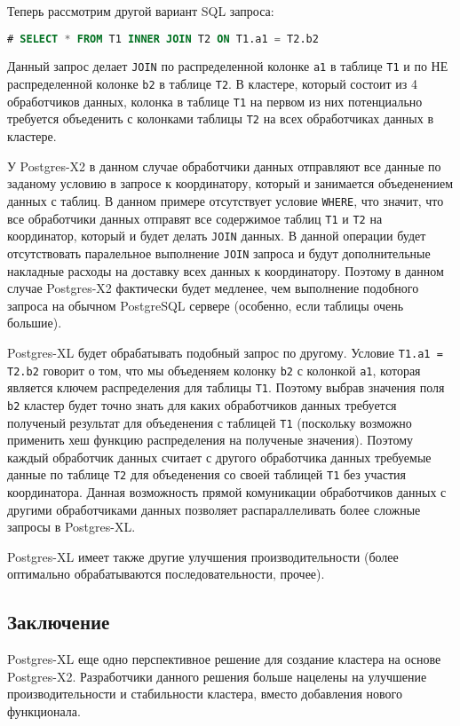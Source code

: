 Теперь рассмотрим другой вариант SQL запроса:

\begin{lstlisting}[language=SQL,label=lst:postgres-xl1,caption=Запрос на распределенные таблицы]
# SELECT * FROM T1 INNER JOIN T2 ON T1.a1 = T2.b2
\end{lstlisting}

Данный запрос делает \lstinline!JOIN! по распределенной колонке \lstinline!a1! в таблице \lstinline!T1! и по НЕ распределенной колонке \lstinline!b2! в таблице \lstinline!T2!. В кластере, который состоит из 4 обработчиков данных, колонка в таблице \lstinline!T1! на первом из них потенциально требуется объеденить с колонками таблицы \lstinline!T2! на всех обработчиках данных в кластере.

У Postgres-X2 в данном случае обработчики данных отправляют все данные по заданому условию в запросе к координатору, который и занимается объеденением данных с таблиц. В данном примере отсутствует условие \lstinline!WHERE!, что значит, что все обработчики данных отправят все содержимое таблиц \lstinline!T1! и \lstinline!T2! на координатор, который и будет делать \lstinline!JOIN! данных. В данной операции будет отсутствовать паралельное выполнение \lstinline!JOIN! запроса и будут дополнительные накладные расходы на доставку всех данных к координатору. Поэтому в данном случае Postgres-X2 фактически будет медленее, чем выполнение подобного запроса на обычном PostgreSQL сервере (особенно, если таблицы очень большие).

Postgres-XL будет обрабатывать подобный запрос по другому. Условие \lstinline!T1.a1 = T2.b2! говорит о том, что мы объеденяем колонку \lstinline!b2! с колонкой \lstinline!a1!, которая является ключем распределения для таблицы \lstinline!T1!. Поэтому выбрав значения поля \lstinline!b2! кластер будет точно знать для каких обработчиков данных требуется полученый результат для объеденения с таблицей \lstinline!T1! (поскольку возможно применить хеш функцию распределения на полученые значения). Поэтому каждый обработчик данных считает с другого обработчика данных требуемые данные по таблице \lstinline!T2! для объеденения со своей таблицей \lstinline!T1! без участия координатора. Данная возможность прямой комуникации обработчиков данных с другими обработчиками данных позволяет распараллеливать более сложные запросы в Postgres-XL.

Postgres-XL имеет также другие улучшения производительности (более оптимально обрабатываются последовательности, прочее).


\subsection{Заключение}

Postgres-XL еще одно перспективное решение для создание кластера на основе Postgres-X2. Разработчики данного решения больше нацелены на улучшение производительности и стабильности кластера, вместо добавления нового функционала.

